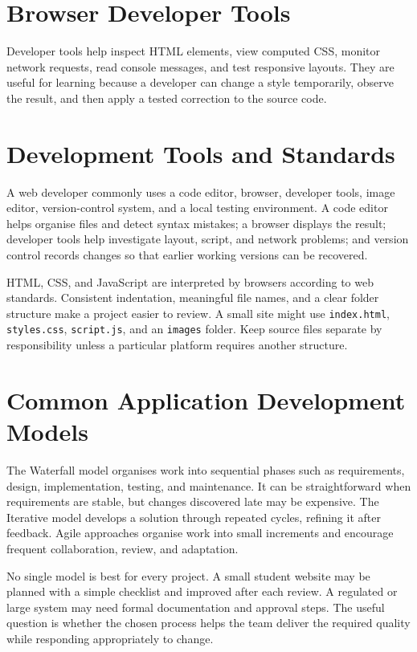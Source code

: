 \documentclass[11pt,openany,oneside]{book}
\begin{document}
\section{Browser Developer Tools}
Developer tools help inspect HTML elements, view computed CSS, monitor network requests, read console messages, and test responsive layouts. They are useful for learning because a developer can change a style temporarily, observe the result, and then apply a tested correction to the source code.


\section{Development Tools and Standards}
A web developer commonly uses a code editor, browser, developer tools, image editor, version-control system, and a local testing environment. A code editor helps organise files and detect syntax mistakes; a browser displays the result; developer tools help investigate layout, script, and network problems; and version control records changes so that earlier working versions can be recovered.

HTML, CSS, and JavaScript are interpreted by browsers according to web standards. Consistent indentation, meaningful file names, and a clear folder structure make a project easier to review. A small site might use \texttt{index.html}, \texttt{styles.css}, \texttt{script.js}, and an \texttt{images} folder. Keep source files separate by responsibility unless a particular platform requires another structure.

\section{Common Application Development Models}
The Waterfall model organises work into sequential phases such as requirements, design, implementation, testing, and maintenance. It can be straightforward when requirements are stable, but changes discovered late may be expensive. The Iterative model develops a solution through repeated cycles, refining it after feedback. Agile approaches organise work into small increments and encourage frequent collaboration, review, and adaptation.

No single model is best for every project. A small student website may be planned with a simple checklist and improved after each review. A regulated or large system may need formal documentation and approval steps. The useful question is whether the chosen process helps the team deliver the required quality while responding appropriately to change.
\end{document}
